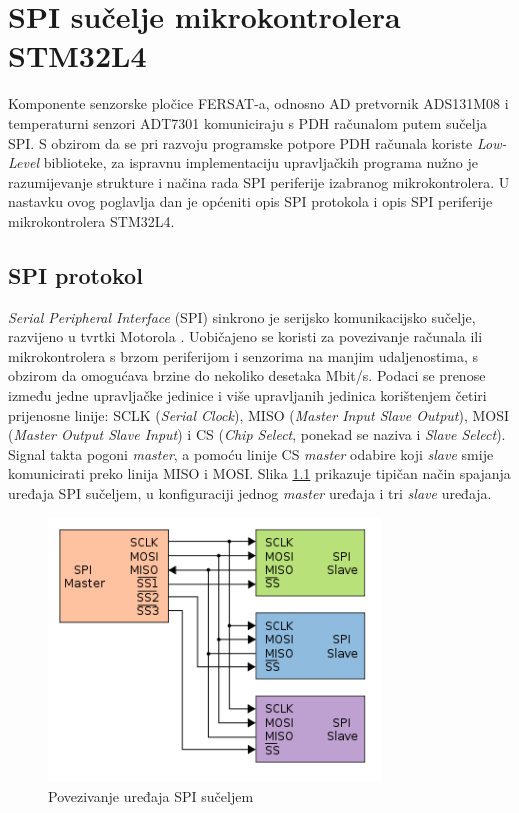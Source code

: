 \chapter{SPI sučelje mikrokontrolera STM32L4}
	Komponente senzorske pločice FERSAT-a, odnosno AD pretvornik ADS131M08 i temperaturni senzori ADT7301 komuniciraju s PDH računalom putem sučelja SPI. S obzirom da se pri razvoju programske potpore PDH računala koriste \textit{Low-Level} biblioteke, za ispravnu implementaciju upravljačkih programa nužno je razumijevanje strukture i načina rada SPI periferije izabranog mikrokontrolera. U nastavku ovog poglavlja dan je općeniti opis SPI protokola i opis SPI periferije mikrokontrolera STM32L4.
	
	\section{SPI protokol}
		\textit{Serial Peripheral Interface} (SPI) sinkrono je serijsko komunikacijsko sučelje, razvijeno u tvrtki Motorola \citep{wiki:spi}. Uobičajeno se koristi za povezivanje računala ili mikrokontrolera s brzom periferijom i senzorima na manjim udaljenostima, s obzirom da omogućava brzine do nekoliko desetaka Mbit/s. Podaci se prenose između jedne upravljačke jedinice  i više upravljanih jedinica  korištenjem četiri prijenosne linije: SCLK (\textit{Serial Clock}), MISO (\textit{Master Input Slave Output}), MOSI (\textit{Master Output Slave Input}) i CS (\textit{Chip Select}, ponekad se naziva i \textit{Slave Select}). Signal takta pogoni \textit{master}, a pomoću linije CS \textit{master} odabire koji \textit{slave} smije komunicirati preko linija MISO i MOSI. Slika \ref{fig:spi} prikazuje tipičan način spajanja uređaja SPI sučeljem, u konfiguraciji jednog \textit{master} uređaja i tri \textit{slave} uređaja.
		
		\begin{figure}[htb]
			\centering
			\includegraphics[height=7cm]{slike/spi.png}
			\caption{Povezivanje uređaja SPI sučeljem}
			\label{fig:spi}
		\end{figure}
	
